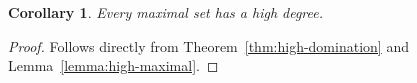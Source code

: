 \documentclass{article}
\newtheorem{corollary}{Corollary}[subsection]
\begin{document}
  \begin{corollary}
    Every maximal set has a high degree.
  \end{corollary}
  \begin{proof}
    Follows directly from Theorem~\ref{thm:high-domination} and
    Lemma~\ref{lemma:high-maximal}.
  \end{proof}
\end{document}

